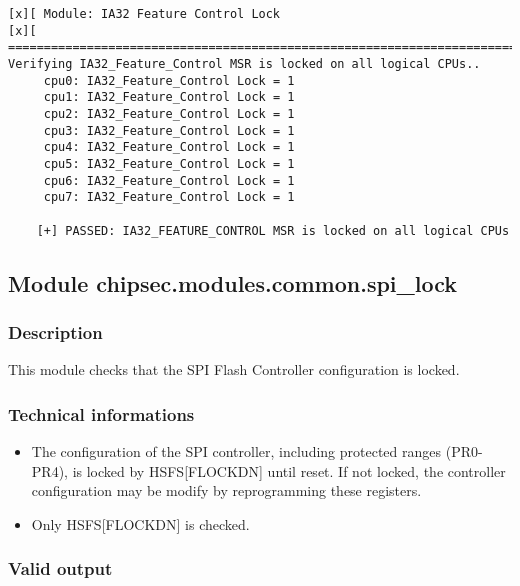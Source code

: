 \begin{verbatim}
[x][ Module: IA32 Feature Control Lock
[x][ =======================================================================
Verifying IA32_Feature_Control MSR is locked on all logical CPUs..
     cpu0: IA32_Feature_Control Lock = 1
     cpu1: IA32_Feature_Control Lock = 1
     cpu2: IA32_Feature_Control Lock = 1
     cpu3: IA32_Feature_Control Lock = 1
     cpu4: IA32_Feature_Control Lock = 1
     cpu5: IA32_Feature_Control Lock = 1
     cpu6: IA32_Feature_Control Lock = 1
     cpu7: IA32_Feature_Control Lock = 1

    [+] PASSED: IA32_FEATURE_CONTROL MSR is locked on all logical CPUs
\end{verbatim}

\hypertarget{module-chipsec.modules.common.spi_lock}{%
\subsection{Module
chipsec.modules.common.spi\_lock}\label{module-chipsec.modules.common.spi_lock}}

\hypertarget{description-3}{%
\subsubsection{Description}\label{description-3}}

This module checks that the SPI Flash Controller configuration is
locked.

\hypertarget{technical-informations-3}{%
\subsubsection{Technical informations}\label{technical-informations-3}}

\begin{itemize}
\tightlist
\item
  The configuration of the SPI controller, including protected ranges
  (PR0-PR4), is locked by HSFS{[}FLOCKDN{]} until reset. If not locked,
  the controller configuration may be modify by reprogramming these
  registers.
\item
  Only HSFS{[}FLOCKDN{]} is checked.
\end{itemize}

\hypertarget{valid-output-3}{%
\subsubsection{Valid output}\label{valid-output-3}}

